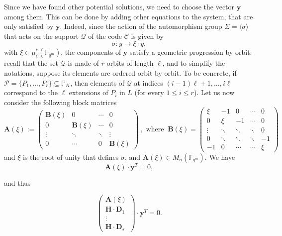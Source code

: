 \documentclass[10pt]{article}
\theoremstyle{definition}
\theoremstyle{definition}
\theoremstyle{definition}
\newcommand{\cd}{\cdot}
\newcommand{\PP}{\mathbb{P}}
\newcommand{\Fqm}{\mathbb{F}_{q^m}}
\newcommand{\su}{\subseteq}
\newcommand{\PR}{\mathcal{P}}
\newcommand{\QR}{\mathcal{Q}}
\begin{document}
Since we have found other potential solutions, we need to choose the vector $\mathbf{y}$ among them. This can be done by adding other equations to the system, that are only satisfied by $\mathbf{y}$. Indeed, since the action of the automorphism group $\Sigma = \langle\sigma\rangle$ that acts on the support $\QR$ of the code $\mathcal{C}$ is given by 
\[\sigma : y \longrightarrow \xi \cd y,\]
with $\xi \in \mu^*_{\ell}(\Fqm)$, the components of $\mathbf{y}$ satisfy a geometric progression by orbit: recall that the set $\QR$ is made of $r$ orbits of length $\ell$, and to simplify the notations, suppose its elements are ordered orbit by orbit. To be concrete, if $\PR = \{P_1,...,P_r\} \su \PP_K$, then elements of $\QR$ at indices $(i-1)\ell+1,...,i\ell$ correspond to the $\ell$ extensions of $P_{i}$ in $L$ (for every $1\leq i \leq r$). Let us now consider the following block matrices
\begin{equation*} 
\mathbf{A}(\xi) := 
\begin{pmatrix}
\mathbf{B}(\xi) & 0 & \cdots & 0 \\
0 & \mathbf{B}(\xi) & \cdots & 0 \\
\vdots & \ddots & \ddots & \vdots \\
0 & \cdots & 0 & \mathbf{B}(\xi)
\end{pmatrix} \ , \textrm{ where }\ 
\mathbf{B}(\xi) = 
\begin{pmatrix}
\xi & -1 & 0 & \cdots & 0 \\
0 & \xi & -1 & \cdots & 0 \\
\vdots & \ddots & \ddots & \ddots & 0 \\
0 & \ddots & \ddots & \ddots & -1 \\
-1 & 0 & \cdots & \cdots & \xi
\end{pmatrix}
\end{equation*}
and $\xi$ is the root of unity that defines $\sigma$, and $\mathbf{A}(\xi) \in M_{n}(\Fqm)$. We have
\begin{equation*}
\mathbf{A}(\xi) \cd \textbf{y}^T
= 0,
\end{equation*}

and thus

\begin{equation} \label{system kummer}
\begin{pmatrix}
\mathbf{A}(\xi) \\
\mathbf{H} \cd \mathbf{D}_1 \\
\vdots \\
\mathbf{H} \cd \mathbf{D}_s
\end{pmatrix}
\cd \mathbf{y}^T = 0.
\end{equation}
\end{document}
